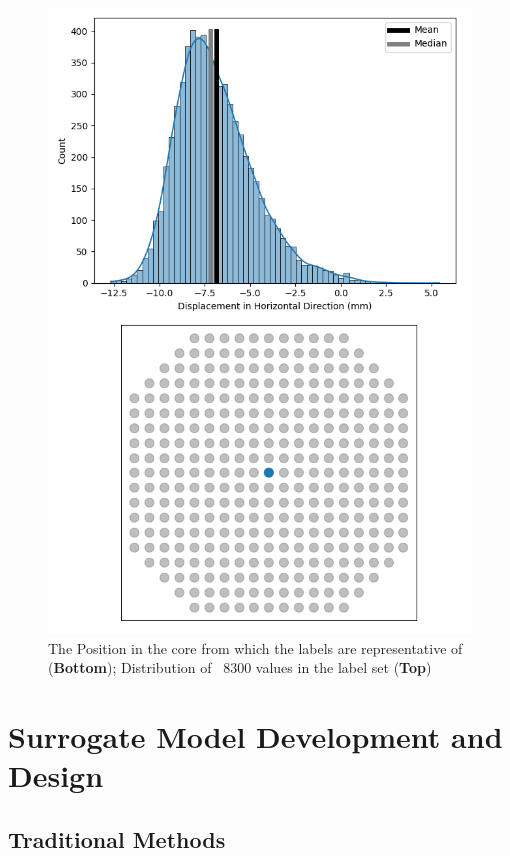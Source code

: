 \begin{figure}[p]
	\centering
	\includegraphics[scale=0.7]{Figures/position_distribution.png}
	\caption{The Position in the core from which the labels are representative of (\textbf{Bottom}); Distribution of ~8300 values in the label set (\textbf{Top})}
	\label{fig:pos_distr}
\end{figure}

\section{Surrogate Model Development and Design} \label{method}

\subsection{Traditional Methods} \label{traditional}

